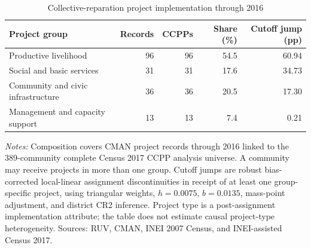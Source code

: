 \begin{table}[!htbp]
\centering
\caption{Collective-reparation project implementation through 2016}
\label{tab:hte-2017-ccpp-projects}
\small
\begin{tabular}{lrrrr}
\toprule
Project group & Records & CCPPs & Share (\%) & Cutoff jump (pp) \\
\midrule
Productive livelihood & 96 & 96 & 54.5 & 60.94 \\
Social and basic services & 31 & 31 & 17.6 & 34.73 \\
Community and civic infrastructure & 36 & 36 & 20.5 & 17.30 \\
Management and capacity support & 13 & 13 & 7.4 & 0.21 \\
\bottomrule
\end{tabular}
\parbox{0.97\linewidth}{\footnotesize \textit{Notes:} Composition covers CMAN project records through 2016 linked to the 389-community complete Census 2017 CCPP analysis universe. A community may receive projects in more than one group. Cutoff jumps are robust bias-corrected local-linear assignment discontinuities in receipt of at least one group-specific project, using triangular weights, \(h=0.0075\), \(b=0.0135\), mass-point adjustment, and district CR2 inference. Project type is a post-assignment implementation attribute; the table does not estimate causal project-type heterogeneity. Sources: RUV, CMAN, INEI 2007 Census, and INEI-assisted Census 2017.}
\end{table}
